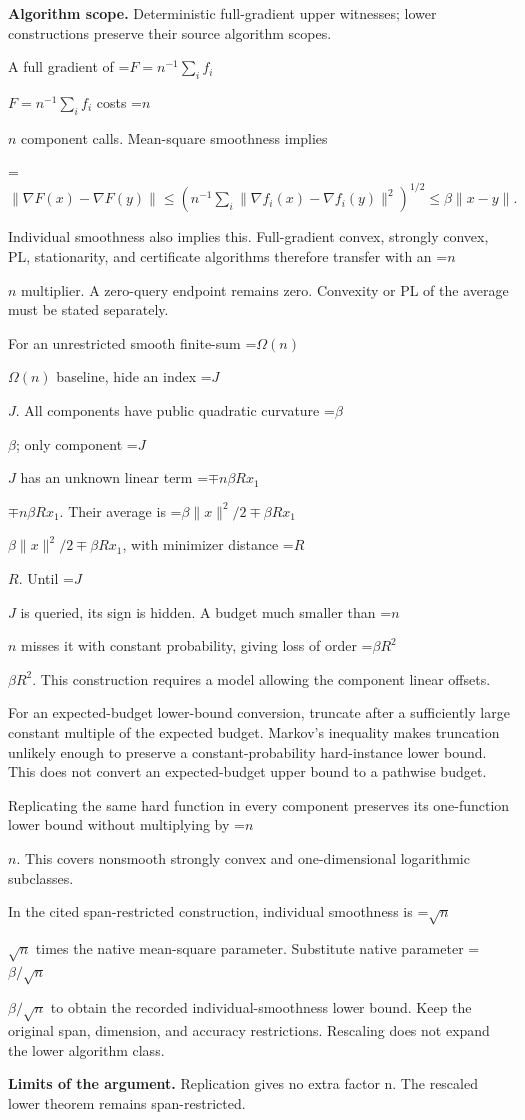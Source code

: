 \documentclass[10pt,a4paper]{article}
\newcommand{\AtlasMath}[1]{\par\begingroup\centering\setbox0=\hbox{$\displaystyle #1$}\ifdim\wd0>1.4\linewidth\typeout{ATLAS WIDE FORMULA: \the\wd0}\fi\ifdim\wd0>\linewidth\resizebox{\linewidth}{!}{\box0}\else\box0\fi\par\endgroup}
\newcommand{\AtlasInlineMath}[1]{\begingroup\setbox0=\hbox{$#1$}\ifdim\wd0>.4\linewidth\endgroup\AtlasMath{#1}\else\endgroup$#1$\fi}
\begin{document}
\textbf{Algorithm scope.} Deterministic full-gradient upper witnesses; lower constructions preserve their source algorithm scopes.

A full gradient of \AtlasInlineMath{F=n^{-1}\sum_i f_i} costs \AtlasInlineMath{n} component calls. Mean-square smoothness implies

\AtlasMath{\|\nabla F(x)-\nabla F(y)\|
\le(n^{-1}\sum_i\|\nabla f_i(x)-\nabla f_i(y)\|^2)^{1/2}
\le\beta\|x-y\|.}

Individual smoothness also implies this. Full-gradient convex, strongly convex, PL, stationarity, and certificate algorithms therefore transfer with an \AtlasInlineMath{n} multiplier. A zero-query endpoint remains zero. Convexity or PL of the average must be stated separately.

For an unrestricted smooth finite-sum \AtlasInlineMath{\Omega(n)} baseline, hide an index \AtlasInlineMath{J}. All components have public quadratic curvature \AtlasInlineMath{\beta}; only component \AtlasInlineMath{J} has an unknown linear term \AtlasInlineMath{\mp n\beta R x_1}. Their average is
\AtlasInlineMath{\beta\|x\|^2/2\mp\beta Rx_1}, with minimizer distance \AtlasInlineMath{R}. Until \AtlasInlineMath{J} is queried, its sign is hidden. A budget much smaller than \AtlasInlineMath{n} misses it with constant probability, giving loss of order \AtlasInlineMath{\beta R^2}. This construction requires a model allowing the component linear offsets.

For an expected-budget lower-bound conversion, truncate after a sufficiently large constant multiple of the expected budget. Markov's inequality makes truncation unlikely enough to preserve a constant-probability hard-instance lower bound. This does not convert an expected-budget upper bound to a pathwise budget.

Replicating the same hard function in every component preserves its one-function lower bound without multiplying by \AtlasInlineMath{n}. This covers nonsmooth strongly convex and one-dimensional logarithmic subclasses.

In the cited span-restricted construction, individual smoothness is \AtlasInlineMath{\sqrt n} times the native mean-square parameter. Substitute native parameter \AtlasInlineMath{\beta/\sqrt n} to obtain the recorded individual-smoothness lower bound. Keep the original span, dimension, and accuracy restrictions. Rescaling does not expand the lower algorithm class.

\textbf{Limits of the argument.} Replication gives no extra factor n. The rescaled lower theorem remains span-restricted.
\end{document}
